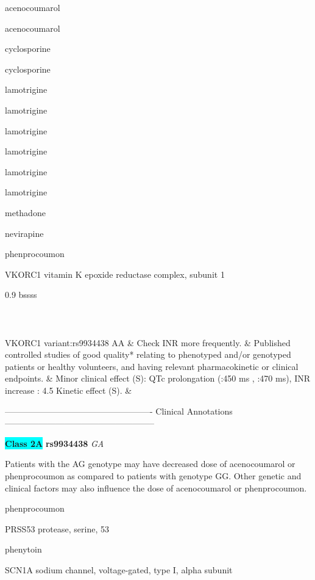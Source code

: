 \documentclass{resume} %
\begin{document}
\begin{rSection}{ acenocoumarol }
\begin{rSection}{ acenocoumarol }
\begin{rSection}{ cyclosporine }
\begin{rSection}{ cyclosporine }
\begin{rSection}{ lamotrigine }
\begin{rSection}{ lamotrigine }
\begin{rSection}{ lamotrigine }
\begin{rSection}{ lamotrigine }
\begin{rSection}{ lamotrigine }
\begin{rSection}{ lamotrigine }
\begin{rSection}{ methadone }
\begin{rSection}{ nevirapine }
\begin{rSection}{ phenprocoumon }
\begin{rSubsection}{ VKORC1 }{ vitamin K epoxide reductase complex, subunit 1 }{}{}
\begin{center}
\begin{tabularx}{0.9\textwidth}{ bssss }
\\
		\vspace{1pt}\\
		\hline \\
		\vspace{1pt}\\
		         VKORC1 variant:rs9934438 AA & Check INR more frequently. & Published controlled studies of good quality* relating to phenotyped and/or genotyped patients or healthy volunteers, and having relevant pharmacokinetic or clinical endpoints. & Minor clinical effect (S): QTc prolongation (:450 ms , :470 ms),  INR increase : 4.5 Kinetic effect (S). &
\\
		\end{tabularx}
		\end{center}
		\normalsize
		\vspace{10pt}
		        
\item[] ---------------------------------------------------- Clinical Annotations -----------------------------------------------------\newline
\item \textbf{\colorbox{cyan} {Class 2A}} \textbf{ rs9934438 } \textit{ GA }
\item[] Patients with the AG genotype may have decreased dose of acenocoumarol or phenprocoumon as compared to patients with genotype GG. Other genetic and clinical factors may also influence the dose of acenocoumarol or phenprocoumon.

\end{rSubsection}\begin{rSection}{ phenprocoumon }
\item[]
\begin{rSubsection}{ PRSS53 }{ protease, serine, 53 }{}{}
\item[]


\end{rSubsection}

\end{rSection}\begin{rSection}{ phenytoin }
\item[]
\begin{rSubsection}{ SCN1A }{ sodium channel, voltage-gated, type I, alpha subunit }{}{}
\item[]


\end{rSubsection}


\end{rSection}
\end{rSection}
\end{rSection}
\end{rSection}
\end{rSection}
\end{rSection}
\end{rSection}
\end{rSection}
\end{rSection}
\end{rSection}
\end{rSection}
\end{rSection}
\end{rSection}
\end{rSection}
\end{document}
